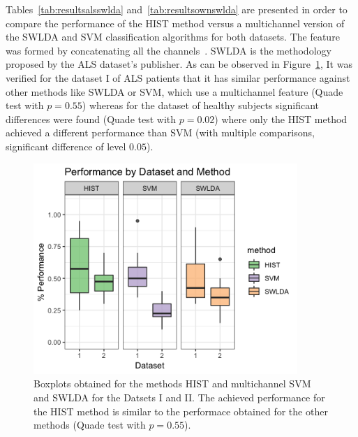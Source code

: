 Tables~\ref{tab:resultsalsswlda} and~\ref{tab:resultsownswlda} are presented in order to compare the performance of the HIST method versus a multichannel version of the SWLDA and SVM classification algorithms for both datasets.  The feature was formed by concatenating all the channels~\cite{Krusienski2006}.  SWLDA is the methodology proposed by the ALS dataset's publisher.  As can be observed in Figure~\ref{fig:boxplots}, It was verified for the dataset I of ALS patients that it has similar performance  against other methods like SWLDA or SVM, which use a multichannel feature (Quade test with $p=0.55$) whereas for the dataset of healthy subjects significant differences were found (Quade test with $p=0.02$) where only the HIST method achieved a different performance than SVM (with multiple comparisons, significant difference of level $0.05$).

\begin{figure}[h!]
\centering
\includegraphics[width=10cm]{images/boxplots.png}
\caption[Dataset I and II Performances Boxplots]{Boxplots obtained for the methods HIST and multichannel SVM and SWLDA for the Datsets I and II.  The achieved performance for the HIST method is similar to the performace obtained for the other methods (Quade test with $p=0.55$).}
\label{fig:boxplots}
\end{figure}

